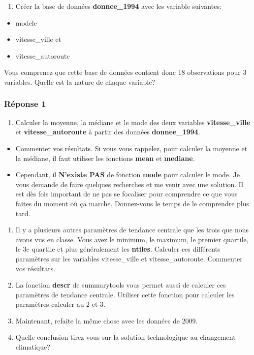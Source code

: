 \documentclass[
]{article}
\providecommand{\tightlist}{%
  \setlength{\itemsep}{0pt}\setlength{\parskip}{0pt}}
\begin{document}
\begin{enumerate}
\def\labelenumi{\arabic{enumi}.}
\tightlist
\item
  Créer la base de données \textbf{donnee\_1994} avec les variable
  suivantes:
\end{enumerate}

\begin{itemize}
\tightlist
\item
  modele
\item
  vitesse\_ville et
\item
  vitesse\_autoroute
\end{itemize}

Vous comprenez que cette base de données contient donc 18 observations
pour 3 variables. Quelle est la nature de chaque variable?

\hypertarget{ruxe9ponse-1}{%
\subsubsection{Réponse 1}\label{ruxe9ponse-1}}

\begin{enumerate}
\def\labelenumi{\arabic{enumi}.}
\setcounter{enumi}{1}
\tightlist
\item
  Calculer la moyenne, la médiane et le mode des deux variables
  \textbf{vitesse\_ville} et \textbf{vitesse\_autoroute} à partir des
  données \textbf{donnee\_1994}.
\end{enumerate}

\begin{itemize}
\tightlist
\item
  Commenter vos résultats. Si vous vous rappelez, pour calculer la
  moyenne et la médiane, il faut utiliser les fonctions \textbf{mean} et
  \textbf{mediane}.
\item
  Cependant, il \textbf{N'existe PAS} de fonction \textbf{mode} pour
  calculer le mode. Je vous demande de faire quelques recherches et me
  venir avec une solution. Il est dès fois important de ne pas se
  focaliser pour comprendre ce que vous faites du moment où ça marche.
  Donnez-vous le temps de le comprendre plus tard.
\end{itemize}

\begin{enumerate}
\def\labelenumi{\arabic{enumi}.}
\setcounter{enumi}{2}
\item
  Il y a plusieurs autres paramètres de tendance centrale que les trois
  que nous avons vus en classe. Vous avez le minimum, le maximum, le
  premier quartile, le 3e quartile et plus généralement les
  \textbf{ntiles}. Calculer ces différents paramètres sur les variables
  vitesse\_ville et vitesse\_autoroute. Commenter vos résultats.
\item
  La fonction \textbf{descr} de summarytools vous permet aussi de
  calculer ces paramètres de tendance centrale. Utiliser cette fonction
  pour calculer les paramètres calculer au 2 et 3.
\item
  Maintenant, refaite la même chose avec les données de 2009.
\item
  Quelle conclusion tirez-vous sur la solution technologique au
  changement climatique?
\end{enumerate}
\end{document}
